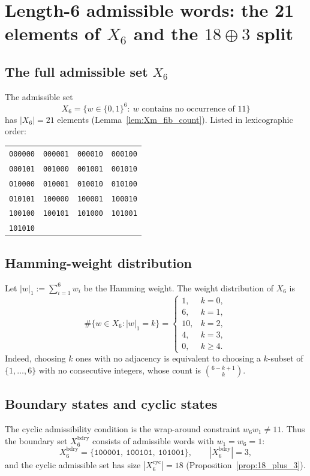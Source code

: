 
\section{Length-6 admissible words: the 21 elements of \texorpdfstring{$X_6$}{X6} and the \texorpdfstring{$18\oplus 3$}{18+3} split}
\label{app:x6_words}

\subsection{The full admissible set \texorpdfstring{$X_6$}{X6}}
The admissible set
\[
X_6=\{w\in\{0,1\}^6:\ \text{$w$ contains no occurrence of $11$}\}
\]
has $|X_6|=21$ elements (Lemma~\ref{lem:Xm_fib_count}).
Listed in lexicographic order:

\begin{center}
\renewcommand{\arraystretch}{1.05}
\begin{tabular}{llll}
\texttt{000000} & \texttt{000001} & \texttt{000010} & \texttt{000100} \\
\texttt{000101} & \texttt{001000} & \texttt{001001} & \texttt{001010} \\
\texttt{010000} & \texttt{010001} & \texttt{010010} & \texttt{010100} \\
\texttt{010101} & \texttt{100000} & \texttt{100001} & \texttt{100010} \\
\texttt{100100} & \texttt{100101} & \texttt{101000} & \texttt{101001} \\
\texttt{101010} & & &
\end{tabular}
\end{center}

\subsection{Hamming-weight distribution}
Let $|w|_1:=\sum_{i=1}^6 w_i$ be the Hamming weight.
The weight distribution of $X_6$ is
\[
\#\{w\in X_6:|w|_1=k\}=
\begin{cases}
1, & k=0,\\
6, & k=1,\\
10, & k=2,\\
4, & k=3,\\
0, & k\ge 4.
\end{cases}
\]
Indeed, choosing $k$ ones with no adjacency is equivalent to choosing a $k$-subset of $\{1,\dots,6\}$ with no consecutive integers, whose count is $\binom{6-k+1}{k}$.

\subsection{Boundary states and cyclic states}
The cyclic admissibility condition is the wrap-around constraint $w_6w_1\neq 11$.
Thus the boundary set $X_6^{\mathrm{bdry}}$ consists of admissible words with $w_1=w_6=1$:
\[
X_6^{\mathrm{bdry}}=\{\texttt{100001},\ \texttt{100101},\ \texttt{101001}\},
\qquad |X_6^{\mathrm{bdry}}|=3,
\]
and the cyclic admissible set has size $|X_6^{\mathrm{cyc}}|=18$ (Proposition~\ref{prop:18_plus_3}).



